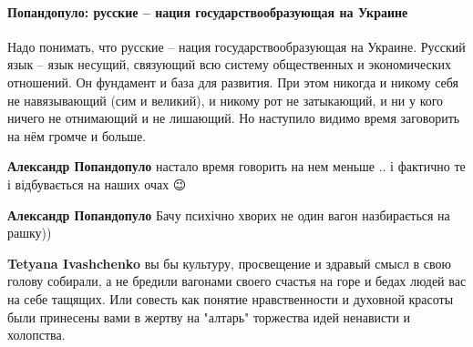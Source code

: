  
 
 
 
 
\paragraph{Попандопуло: русские – нация государствообразующая на Украине}
\label{sec:18_01_2021.fb.bilchenko_evgenia.1.mova_jazyk.cmt.ponandopulo_jazyk_ukraina}

\begin{itemize}


Надо понимать, что русские – нация государствообразующая на Украине. Русский
язык – язык несущий, связующий всю систему общественных и экономических
отношений. Он фундамент и база для развития. При этом никогда и никому себя не
навязывающий (сим и великий), и никому рот не затыкающий, и ни у кого ничего не
отнимающий и не лишающий. Но наступило видимо время заговорить на нём громче и
больше.
	
\begin{itemize}

\textbf{Александр Попандопуло} настало время говорить на нем меньше .. і
фактично те і відбувається на наших очах 😉



\textbf{Александр Попандопуло} Бачу психічно хворих не один вагон назбирається
на рашку))



\textbf{Tetyana Ivashchenko} вы бы культуру, просвещение и здравый смысл в свою
голову собирали, а не бредили вагонами своего счастья на горе и бедах людей вас
на себе тащящих. Или совесть как понятие нравственности и духовной красоты были
принесены вами в жертву на "алтарь" торжества идей ненависти и холопства.




\end{itemize}
\end{itemize}
